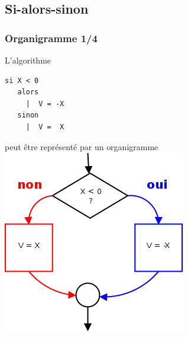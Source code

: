 \subsection{Si-alors-sinon}
\begin{frame}[containsverbatim]
  \frametitle{Organigramme 1/4}
  \begin{multicols}{2}
L'algorithme
\begin{lstlisting}[frame=single]
   si X < 0
   alors
     |  V = -X
   sinon
     |  V =  X
\end{lstlisting}
peut être représenté par un
\alert{organigramme}
\includegraphics[width=\linewidth]{figures/val-abs-1}    
  \end{multicols}
\end{frame}



